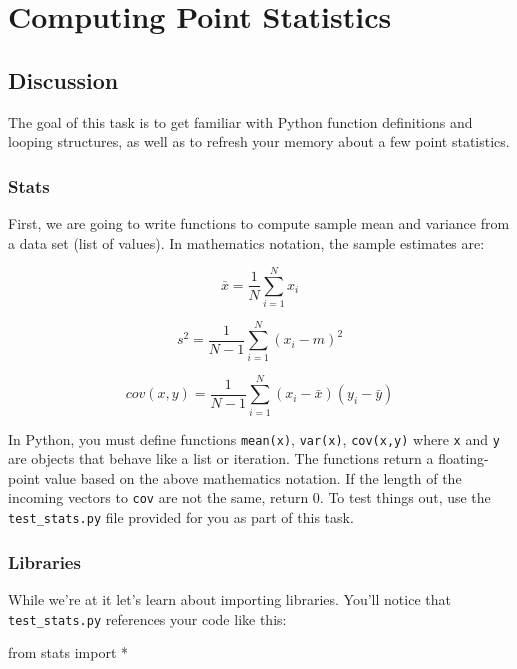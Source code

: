 \chapter{Computing Point Statistics}

\setcounter{problem}{1}
\section{Discussion}

\begin{fullwidth}

The goal of this task is to get familiar with Python function definitions and looping structures, as well as to refresh your memory about a few point statistics. 

\subsection{Stats}

First, we are going to write functions to compute sample mean and variance from a data set (list of values).  In mathematics notation, the sample estimates are:

\[\tag{Sample mean}
\bar x = \frac{1}{N} \sum_{i=1}^{N} x_i 
\]

\[\tag{Unbiased sample variance}
s^2 = \frac{1}{N-1} \sum_{i=1}^{N} (x_i - m)^2
\]

\[\tag{Unbiased sample covariance}
cov(x,y) = \frac{1}{N-1} \sum_{i=1}^{N} (x_i - \bar x)(y_i - \bar y)
\]

In Python, you must define functions {\tt mean(x)}, {\tt var(x)}, {\tt cov(x,y)} where {\tt x} and {\tt y} are objects that behave like a list or iteration. The functions return a floating-point value based on the above mathematics notation. If the length of the incoming vectors to {\tt cov} are not the same, return 0. To test things out, use the {\tt test\_stats.py} file provided for you as part of this task.

\subsection{Libraries}

While we're at it let's learn about importing libraries.  You'll notice that {\tt test\_stats.py} references your code like this:

\begin{pyverbatim}
from stats import *
\end{pyverbatim}


\end{fullwidth}
